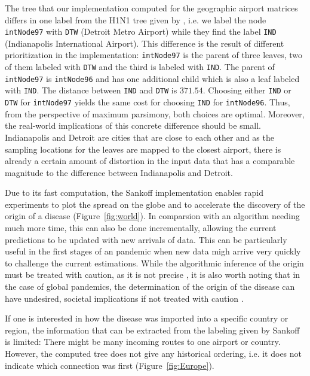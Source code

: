 \documentclass{article}
\begin{document}
The tree that our implementation computed for the geographic airport matrices
differs in one label from the H1N1 tree given by
\cite{reimeringPhylogeographicReconstructionUsing2020}, i.e. we label the node
\texttt{intNode97} with \texttt{DTW} (Detroit Metro Airport) while they find the label
\texttt{IND} (Indianapolis International Airport).
This difference is the result of different prioritization in the implementation:
\texttt{intNode97} is the parent of three leaves, two of them labeled with
\texttt{DTW} and the third is labeled with \texttt{IND}. The parent of
\texttt{intNode97} is \texttt{intNode96} and has one additional child which is
also a leaf labeled with \texttt{IND}. The distance between \texttt{IND}
and \texttt{DTW} is $371.54$. Choosing either \texttt{IND} or \texttt{DTW} for
\texttt{intNode97} yields the same cost for choosing \texttt{IND} for
\texttt{intNode96}. Thus, from the perspective of maximum parsimony, both
choices are optimal. Moreover, the real-world implications of this concrete
difference should be small. Indianapolis and Detroit are cities that are close
to each other and as the sampling locations for the leaves are mapped to the
closest airport, there is already a certain amount of distortion
 in the input data that has a comparable magnitude to
the difference between Indianapolis and Detroit.

Due to its fast computation, the Sankoff implementation enables rapid
experiments to plot the spread on the globe and to accelerate the discovery 
of the origin of a disease
(Figure~\ref{fig:world}). In comparsion with an algorithm needing much more time,
this can also be done incrementally, allowing the current predictions to be
updated with new arrivals of data. This can be particularly useful in the first stages
of an pandemic when new data migh arrive very quickly to challenge the current
estimations. While the algorithmic inference of the origin must be
treated with caution, as it is not precise
\cite{reimeringPhylogeographicReconstructionUsing2020}, it is also worth noting
that in the case of global pandemics, the determination of the origin of the
disease can have undesired, societal implications if not treated with caution
\cite{chenPotentialImpactCOVID192020}.

If one is interested in how the disease was imported into a specific country or
region, the information that can be extracted from the labeling given by Sankoff
is limited: There might be many incoming routes to one airport or country. However,
the computed tree does not give any historical ordering, i.e. it does not
indicate which connection was first (Figure~\ref{fig:Europe}).
\end{document}
